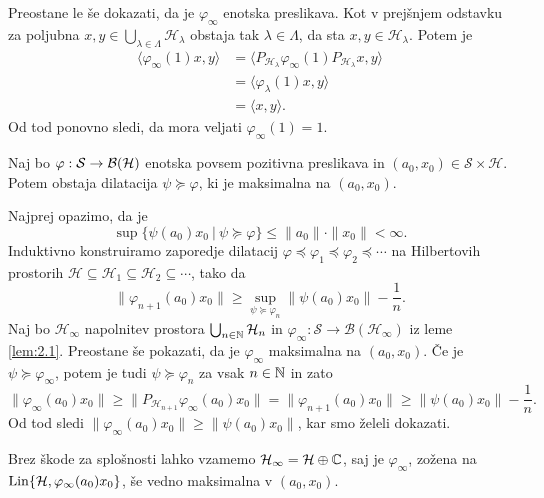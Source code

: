 \begin{dokaz}
    Preostane le še dokazati, da je $\varphi_\infty$ enotska preslikava. Kot v prejšnjem odstavku 
    za poljubna $x, y \in \bigcup_{\lambda \in \Lambda} \mathcal{H}_\lambda$ obstaja tak $\lambda \in \Lambda$, da sta $x, y \in \mathcal{H}_\lambda$.
    Potem je 
    \begin{align*}
        \langle \varphi_\infty (1)x, y \rangle &= \langle P_{\mathcal{H}_\lambda}\varphi_\infty (1) P_{\mathcal{H}_\lambda}x, y \rangle\\
        &= \langle \varphi_\lambda (1) x, y \rangle\\
        &= \langle x, y \rangle.
    \end{align*} 
    Od tod ponovno sledi, da mora veljati $\varphi_\infty (1) = 1$.
\end{dokaz}

\begin{trditev}\label{trd:2.3}
    Naj bo $\varphi: \mathcal{S} \to \operatorname{\mathcal{B} (\mathcal{H})}$ enotska povsem pozitivna preslikava in $(a_0, x_0) \in \mathcal{S} \times \mathcal{H}$.
    Potem obstaja dilatacija $\psi \succeq \varphi$, ki je maksimalna na $(a_0, x_0)$.
\end{trditev}

\begin{dokaz}
    Najprej opazimo, da je 
    $$\sup \{\psi (a_0) x_0\ |\ \psi \succeq \varphi\} \leq \| a_0 \| \cdot \| x_0 \| < \infty.$$
    Induktivno konstruiramo zaporedje dilatacij $\varphi \preceq \varphi_1 \preceq \varphi_2 \preceq \cdots$ 
    na Hilbertovih prostorih $\mathcal{H} \subseteq \mathcal{H}_1 \subseteq \mathcal{H}_2 \subseteq \cdots$, tako da 
    $$\| \varphi_{n + 1} (a_0) x_0 \| \geq \sup_{\psi \succeq \varphi_n} \| \psi(a_0) x_0 \| - \frac{1}{n}.$$
    Naj bo $\mathcal{H}_\infty$ napolnitev prostora $\bigcup_{n \in \mathbb N} \mathcal{H}_n$ 
    in $\varphi_\infty: \mathcal{S} \to \mathcal{B} (\mathcal{H}_\infty)$ iz leme \ref{lem:2.1}.
    Preostane še pokazati, da je $\varphi_\infty$ maksimalna na $(a_0, x_0)$.
    Če je $\psi \succeq \varphi_\infty$, potem je tudi $\psi \succeq \varphi_n$ za vsak $n \in \mathbb N$ in zato 
    $$\| \varphi_\infty (a_0) x_0 \| \geq \| P_{\mathcal{H}_{n + 1}} \varphi_\infty (a_0) x_0 \| = \| \varphi_{n + 1} (a_0) x_0 \| \geq \| \psi (a_0) x_0 \| - \frac{1}{n}.$$
    Od tod sledi $\| \varphi_\infty (a_0) x_0 \| \geq \| \psi (a_0) x_0 \|$, kar smo želeli dokazati.
\end{dokaz}

\begin{opomba}
    Brez škode za splošnosti lahko vzamemo $\mathcal{H}_\infty = \mathcal{H} \oplus \mathbb C$,
    saj je $\varphi_\infty$, zožena na $\operatorname{Lin} \{\mathcal{H}, \varphi_\infty (a_0)x_0 \}$, še vedno maksimalna v $(a_0, x_0)$.
\end{opomba}

